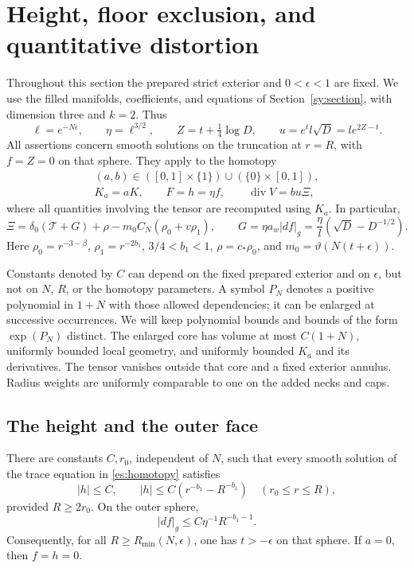 \section{Height, floor exclusion, and quantitative distortion}
\label{es:section}

Throughout this section the prepared strict exterior and
$0<\epsilon<1$ are fixed.  We use the filled manifolds, coefficients, and
equations of Section~\ref{sy:section}, with dimension three and $k=2$.
Thus
\[
 \ell=e^{-N\epsilon},\qquad \eta=\ell^{3/2},\qquad
 Z=t+\tfrac14\log D,\qquad
 u=e^t l\sqrt D=l e^{2Z-t}.
\]
All assertions concern smooth solutions on the truncation at $r=R$, with
$f=Z=0$ on that sphere.  They apply to the homotopy
\begin{equation}\label{es:homotopy}
 \begin{gathered}
 (a,b)\in([0,1]\times\{1\})\cup(\{0\}\times[0,1]),\\
 K_a=aK,\qquad F=h=\eta f,\qquad
 \operatorname{div}V=b u\Xi,
 \end{gathered}
\end{equation}
where all quantities involving the tensor are recomputed using $K_a$.
In particular,
\begin{equation}\label{es:source}
 \Xi=\delta_0(\mathcal T+G)+\rho
       -m_0 C_N(\rho_0+v\rho_1),\qquad
 G=\eta a_w|df|_g
   =\frac{\eta}{l}(\sqrt D-D^{-1/2}).
\end{equation}
Here $\rho_0=r^{-3-\beta}$, $\rho_1=r^{-2b_1}$,
$3/4<b_1<1$, $\rho=c_*\rho_0$, and
$m_0=\vartheta(N(t+\epsilon))$.

Constants denoted by $C$ can depend on the fixed prepared exterior and on
$\epsilon$, but not on $N$, $R$, or the homotopy parameters.
A symbol $P_N$ denotes a positive polynomial in $1+N$ with those allowed
dependencies; it can be enlarged at successive occurrences.  We will
keep polynomial bounds and bounds of the form $\exp(P_N)$ distinct.
The enlarged core has volume at most $C(1+N)$, uniformly bounded local
geometry, and uniformly bounded $K_a$ and its derivatives.  The tensor
vanishes outside that core and a fixed exterior annulus.  Radius weights
are uniformly comparable to one on the added necks and caps.

\subsection{The height and the outer face}

\begin{lemma}\label{es:height}
There are constants $C,r_0$, independent of $N$, such that every smooth
solution of the trace equation in \eqref{es:homotopy} satisfies
\begin{equation}\label{es:height-bound}
 |h|\le C,
 \qquad
 |h|\le C(r^{-b_1}-R^{-b_1})\quad(r_0\le r\le R),
\end{equation}
provided $R\ge2r_0$.  On the outer sphere,
\begin{equation}\label{es:face-slope}
 |df|_g\le C\eta^{-1}R^{-b_1-1}.
\end{equation}
Consequently, for all $R\ge R_{\min}(N,\epsilon)$, one has
$t>-\epsilon$ on that sphere.  If $a=0$, then $f=h=0$.
\end{lemma}

